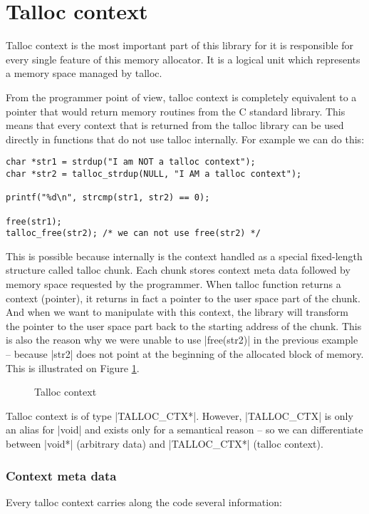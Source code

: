\section{Talloc context}
\label{talloc:sec:context}

Talloc context is the most important part of this library for it is responsible
for every single feature of this memory allocator. It is a logical unit which
represents a memory space managed by talloc.

From the programmer point of view, talloc context is completely equivalent to a
pointer that would return memory routines from the C standard library. This
means that every context that is returned from the talloc library can be used
directly in functions that do not use talloc internally. For example we can do
this:

\begin{lstlisting}
char *str1 = strdup("I am NOT a talloc context");
char *str2 = talloc_strdup(NULL, "I AM a talloc context");

printf("%d\n", strcmp(str1, str2) == 0);

free(str1);
talloc_free(str2); /* we can not use free(str2) */
\end{lstlisting}

This is possible because internally is the context handled as a special
fixed-length structure called talloc chunk. Each chunk stores context meta data
followed by memory space requested by the programmer. When talloc function
returns a context (pointer), it returns in fact a pointer to the user space
part of the chunk. And when we want to manipulate with this context, the
library will transform the pointer to the user space part back to the starting
address of the chunk. This is also the reason why we were unable to use
|free(str2)| in the previous example -- because  |str2| does not point at the
beginning of the allocated block of memory. This is illustrated on Figure
\ref{fig:talloc-context}.

\begin{figure}[H]
  \centering
  
  \caption{Talloc context}
  \label{fig:talloc-context}
\end{figure}

Talloc context is of type |TALLOC_CTX*|. However, |TALLOC_CTX| is only an alias
for |void| and exists only for a semantical reason -- so we can differentiate
between |void*| (arbitrary data) and |TALLOC_CTX*| (talloc context).

\subsubsection{Context meta data}
Every talloc context carries along the code several information:

